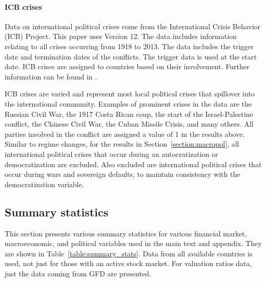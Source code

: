 \paragraph{ICB crises}
Data on international political crises come from the International Crisis Behavior (ICB) Project. This paper uses Version 12. The data includes information relating to all crises occurring from 1918 to 2013. The data includes the trigger date and termination dates of the conflicts. The trigger data is used at the start date. ICB crises are assigned to countries based on their involvement. Further information can be found in \cite{Brecher2017}.

ICB crises are varied and represent most local political crises that spillover into the international community. Examples of prominent crises in the data are the Russian Civil War, the 1917 Costa Rican coup, the start of the Israel-Palestine conflict, the Chinese Civil War, the Cuban Missile Crisis, and many others. All parties involved in the conflict are assigned a value of 1 in the results above. Similar to regime changes, for the results in Section~\ref{section:macropol}, all international political crises that occur during an autocratization or democratization are excluded. Also excluded are international political crises that occur during wars and sovereign defaults, to maintain consistency with the democratization variable.

\subsection{Summary statistics}\label{section:summary_stats}

This section presents various summary statistics for various financial market, macroeconomic, and political variables used in the main text and appendix. They are shown in Table~\ref{table:summary_stats}. Data from all available countries is used, not just for those with an active stock market. For valuation ratios data, just the data coming from GFD are presented.

 

